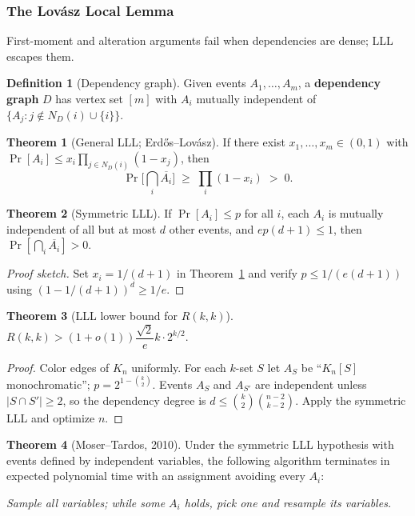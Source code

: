 \documentclass{article}
\theoremstyle{definition}
\newtheorem{theorem}{Theorem}
\newtheorem{definition}{Definition}
\begin{document}
\subsubsection{The Lov\'asz Local Lemma}

First-moment and alteration arguments fail when dependencies are
dense; LLL escapes them.

\begin{definition}[Dependency graph]
Given events $A_1, \dots, A_m$, a \textbf{dependency graph} $D$ has
vertex set $[m]$ with $A_i$ mutually independent of
$\{A_j : j \notin N_D(i) \cup \{i\}\}$.
\end{definition}

\begin{theorem}[General LLL; Erd\H{o}s--Lov\'asz]\label{thm:lll-general}
If there exist $x_1, \dots, x_m \in (0, 1)$ with
$\Pr[A_i] \le x_i \prod_{j \in N_D(i)}(1 - x_j)$, then
\[
  \Pr\Big[\bigcap_i \overline{A_i}\Big]
  \;\ge\; \prod_i (1 - x_i) \;>\; 0.
\]
\end{theorem}

\begin{theorem}[Symmetric LLL]\label{thm:lll}
If $\Pr[A_i] \le p$ for all $i$, each $A_i$ is mutually independent
of all but at most $d$ other events, and $e p (d + 1) \le 1$, then
$\Pr[\bigcap_i \overline{A_i}] > 0$.
\end{theorem}

\begin{proof}[Proof sketch]
Set $x_i = 1/(d + 1)$ in Theorem~\ref{thm:lll-general} and verify
$p \le 1/(e(d + 1))$ using $(1 - 1/(d + 1))^d \ge 1/e$.
\end{proof}

\begin{theorem}[LLL lower bound for $R(k, k)$]
$R(k, k) > (1 + o(1)) \dfrac{\sqrt{2}}{e} k \cdot 2^{k/2}$.
\end{theorem}

\begin{proof}
Color edges of $K_n$ uniformly. For each $k$-set $S$ let $A_S$ be
``$K_n[S]$ monochromatic''; $p = 2^{1 - \binom{k}{2}}$. Events $A_S$
and $A_{S'}$ are independent unless $|S \cap S'| \ge 2$, so the
dependency degree is $d \le \binom{k}{2}\binom{n - 2}{k - 2}$. Apply
the symmetric LLL and optimize $n$.
\end{proof}

\begin{theorem}[Moser--Tardos, 2010]\label{thm:mosertardos}
Under the symmetric LLL hypothesis with events defined by independent
variables, the following algorithm terminates in expected polynomial
time with an assignment avoiding every $A_i$:

\emph{Sample all variables; while some $A_i$ holds, pick one and
resample its variables.}
\end{theorem}
\end{document}
